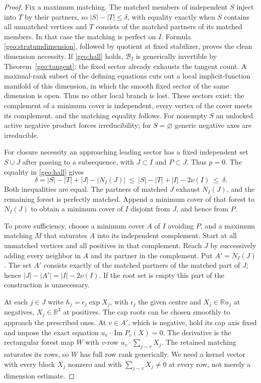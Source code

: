 \begin{proof}
Fix a maximum matching. The matched members of independent \(S\) inject into \(T\) by their partners, so \(|S|-|T|\leq\delta\), with equality exactly when \(S\) contains all unmatched vertices and \(T\) consists of the matched partners of its matched members. In that case the matching is perfect on \(I\). Formula \eqref{geo:stratumdimension}, followed by quotient at fixed stabilizer, proves the clean dimension necessity. If \eqref{geo:hall} holds, \(\mathcal B_I\) is generically invertible by Theorem~\ref{geo:tangent}; the fixed sector already exhausts the tangent count. A maximal-rank subset of the defining equations cuts out a local implicit-function manifold of this dimension, in which the smooth fixed sector of the same dimension is open. Thus no other local branch is lost. These sectors exist: the complement of a minimum cover is independent, every vertex of the cover meets its complement, and the matching equality follows. For nonempty \(S\) an unlocked active negative product forces irreducibility; for \(S=\varnothing\) generic negative axes are irreducible.

For closure necessity an approaching leading sector has a fixed independent set \(S\cup J\) after passing to a subsequence, with \(J\subset I\) and \(P\subset J\). Thus \(p=0\). The equality in \eqref{geo:hall} gives
\[
 \delta=|S|-|T|+|J|-|N_I(J)|
       \ \leq\ |S|-|T|+|I|-2\nu(I)\ \leq\ \delta .
\]
Both inequalities are equal. The partners of matched \(J\) exhaust \(N_I(J)\), and the remaining forest is perfectly matched. Append a minimum cover of that forest to \(N_I(J)\) to obtain a minimum cover of \(I\) disjoint from \(J\), and hence from \(P\).

To prove sufficiency, choose a minimum cover \(A\) of \(I\) avoiding \(P\), and a maximum matching \(M\) that saturates \(A\) into its independent complement. Start at all unmatched vertices and all positives in that complement. Reach \(J\) by successively adding every neighbor in \(A\) and its partner in the complement. Put \(A'=N_I(J)\). The set \(A'\) consists exactly of the matched partners of the matched part of \(J\); hence \(|J|-|A'|=|I|-2\nu(I)\). If the root set is empty this part of the construction is unnecessary.

At each \(j\in J\) write \(h_j=\epsilon_j\exp X_j\), with \(\epsilon_j\) the given centre and \(X_j\in\mathbb R u_j\) at negatives, \(X_j\in\mathbb R^3\) at positives. The cap roots can be chosen smoothly to approach the prescribed ones. At \(v\in A'\), which is negative, hold its cap axis fixed and impose the exact equation \(u_v\cdot\operatorname{Im}P_v(X)=0\). The derivative is the rectangular forest map \(W\) with \(v\)-row \(u_v\cdot\sum_{j\sim v} X_j\). The retained matching saturates its rows, so \(W\) has full row rank generically. We need a kernel vector with every block \(X_j\) nonzero and with \(\sum_{j\sim v}X_j\ne0\) at every row, not merely a dimension estimate.


\end{proof}

